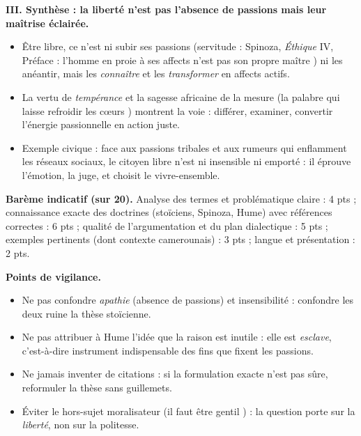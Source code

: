 \documentclass[11pt]{article}
\begin{document}
\begin{corrige}
\textbf{III. Synthèse : la liberté n'est pas l'absence de passions mais leur maîtrise éclairée.}
\begin{itemize}
\item Être libre, ce n'est ni subir ses passions (servitude : Spinoza, \emph{Éthique} IV, Préface : l'homme en proie à ses affects \guillemotleft n'est pas son propre maître \guillemotright) ni les anéantir, mais les \emph{connaître} et les \emph{transformer} en affects actifs.
\item La vertu de \emph{tempérance} et la sagesse africaine de la mesure (la palabre qui laisse \guillemotleft refroidir les cœurs \guillemotright) montrent la voie : différer, examiner, convertir l'énergie passionnelle en action juste.
\item Exemple civique : face aux passions tribales et aux rumeurs qui enflamment les réseaux sociaux, le citoyen libre n'est ni insensible ni emporté : il éprouve l'émotion, la juge, et choisit le vivre-ensemble.
\end{itemize}

\textbf{Barème indicatif (sur 20).} Analyse des termes et problématique claire : 4 pts ; connaissance exacte des doctrines (stoïciens, Spinoza, Hume) avec références correctes : 6 pts ; qualité de l'argumentation et du plan dialectique : 5 pts ; exemples pertinents (dont contexte camerounais) : 3 pts ; langue et présentation : 2 pts.

\textbf{Points de vigilance.}
\begin{itemize}
\item Ne pas confondre \emph{apathie} (absence de passions) et insensibilité : confondre les deux ruine la thèse stoïcienne.
\item Ne pas attribuer à Hume l'idée que la raison est inutile : elle est \emph{esclave}, c'est-à-dire instrument indispensable des fins que fixent les passions.
\item Ne jamais inventer de citations : si la formulation exacte n'est pas sûre, reformuler la thèse sans guillemets.
\item Éviter le hors-sujet moralisateur (\guillemotleft il faut être gentil \guillemotright) : la question porte sur la \emph{liberté}, non sur la politesse.
\end{itemize}

\end{corrige}
\end{document}
